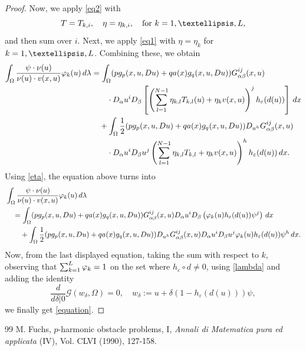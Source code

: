 \documentclass[10pt,a4paper]{amsart}
\theoremstyle{plain}
\theoremstyle{definition}
\theoremstyle{remark}
\newcommand{\tx}[1]{\textnormal{\texttt{#1}}}
\def\d{\,{\rm d}}
\def\dx{\,{\rm d}x}
\begin{document}
\begin{proof}
Now, we apply \eqref{eq2} with
\[
T = T_{k,i}, \quad \eta = \eta_{k,i}, \quad \text{for } k = 1, \dots, \tx{L},
\]
and then sum over \(i\). Next, we apply \eqref{eq1} with \(\eta = \eta_k\) for \(k = 1, \dots, \tx{L}\). Combining these, we obtain
\begin{align*}
  \int_{\Omega} \frac{\psi \cdot \nu(u)}{\nu(u) \cdot v(x,u)} \varphi_k(u) \d\lambda    & =  \int_\Omega (pg_p(x,u,Du) + qa(x) g_q(x,u,Du)) G^{ij}_{\alpha \beta} (x,u) \\ & \qquad \cdot  D_\alpha u^i D_\beta \left [\left ( \sum_{l=1}^{N-1} \eta_{k,l}T_{k,l}(u) + \eta_k v(x,u) \right )^j h_\varepsilon (d(u)) \right ] \dx \\ & \quad + \int_{\Omega} \frac{1}{2}(pg_p(x,u,Du) + qa(x) g_q(x,u,Du))D_{u^h}G^{ij}_{\alpha \beta}(x,u) \\ & \qquad \cdot D_\alpha u^i D_\beta u^j \left ( \sum_{l=1}^{N-1} \eta_{k,l} T_{k,l} + \eta_k v(x,u)\right )^h h_\varepsilon (d(u)) \dx.
\end{align*}
Using \eqref{eta}, the equation above turns into
\begin{align*}
   & \int_{\Omega} \frac{\psi \cdot \nu(u)}{\nu(u) \cdot v(x,u)} \varphi_k(u) \d\lambda \\ & \quad = \int_\Omega (pg_p(x,u,Du) + qa(x)g_q(x,u,Du))G^{ij}_{\alpha \beta} (x,u) D_\alpha u^i D_\beta \left ( \varphi_k(u) h_\varepsilon (d(u)) \psi^j\right ) \dx \\ & \qquad + \int_{\Omega} \frac{1}{2}(pg_p(x,u,Du) + qa(x)g_q(x,u,Du))D_{u^h}G^{ij}_{\alpha \beta}(x,u) D_\alpha u^i D_\beta u^j \varphi_k(u) h_\varepsilon (d(u))  \psi^h \dx.
\end{align*}
Now, from the last displayed equation, taking the sum with respect to $k$, observing that $\sum_{k=1}^{\tx{L}} \varphi_k =1$ on the set where $h_\varepsilon \circ d \neq 0$, using \eqref{lambda} and adding the identity
$$ \frac{d}{d\delta|0}\mathcal{G}(w_\delta, \Omega) =0, \quad w_\delta := u + \delta(1-h_\varepsilon(d(u))) \psi,$$
we finally get \eqref{equation}.
\end{proof}

\begin{thebibliography}{99}
 M. Fuchs, $p$-harmonic obstacle problems, I, \emph{Annali di Matematica pura ed applicata} (IV), Vol. CLVI (1990), 127-158.
\end{thebibliography}
\end{document}
